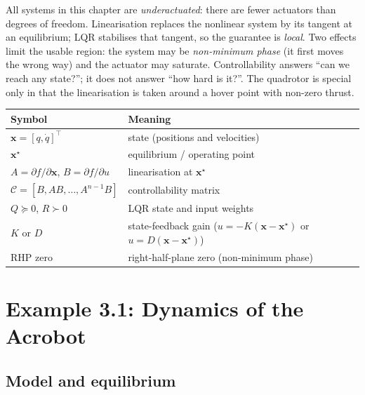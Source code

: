 \documentclass[11pt]{article}
\newcommand{\x}{\mathbf{x}}
\newcommand{\C}{\mathcal{C}}
\begin{document}
\begin{intuition}[breakable=false,title={The big picture in five sentences}]
All systems in this chapter are \emph{underactuated}: there are fewer
actuators than degrees of freedom.  Linearisation replaces the nonlinear
system by its tangent at an equilibrium; LQR stabilises that tangent, so the
guarantee is \emph{local}.  Two effects limit the usable region: the system
may be \emph{non-minimum phase} (it first moves the wrong way) and the
actuator may saturate.  Controllability answers ``can we reach any state?'';
it does not answer ``how hard is it?''.  The quadrotor is special only in that
the linearisation is taken around a hover point with non-zero thrust.
\end{intuition}

\begin{center}
\small
\begin{tabular}{ll}
\toprule
Symbol & Meaning \\
\midrule
$\x=[q,\dot q]^\top$ & state (positions and velocities) \\
$\x^\star$ & equilibrium / operating point \\
$A=\partial f/\partial\x$, $B=\partial f/\partial u$ & linearisation at $\x^\star$ \\
$\C=[B,AB,\dots,A^{n-1}B]$ & controllability matrix \\
$Q\succeq0$, $R\succ0$ & LQR state and input weights \\
$K$ or $D$ & state-feedback gain ($u=-K(\x-\x^\star)$ or $u=D(\x-\x^\star)$) \\
RHP zero & right-half-plane zero (non-minimum phase) \\
\bottomrule
\end{tabular}
\end{center}

\section{Example 3.1: Dynamics of the Acrobot}

\subsection{Model and equilibrium}
\end{document}

